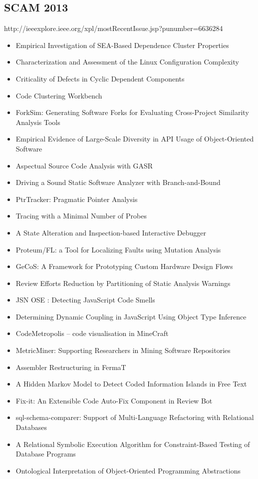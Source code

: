 \subsection{SCAM 2013}

http://ieeexplore.ieee.org/xpl/mostRecentIssue.jsp?punumber=6636284

{\small
\begin{itemize}[itemsep=-1ex]
  \item Empirical Investigation of SEA-Based Dependence Cluster Properties
  \item Characterization and Assessment of the Linux Configuration Complexity
  \item Criticality of Defects in Cyclic Dependent Components
  \item Code Clustering Workbench
  \item ForkSim: Generating Software Forks for Evaluating Cross-Project Similarity Analysis Tools
  \item Empirical Evidence of Large-Scale Diversity in API Usage of Object-Oriented Software
  \item Aspectual Source Code Analysis with GASR
  \item Driving a Sound Static Software Analyzer with Branch-and-Bound
  \item PtrTracker: Pragmatic Pointer Analysis
  \item Tracing with a Minimal Number of Probes
  \item A State Alteration and Inspection-based Interactive Debugger
  \item Proteum/FL: a Tool for Localizing Faults using Mutation Analysis
  \item GeCoS: A Framework for Prototyping Custom Hardware Design Flows
  \item Review Efforts Reduction by Partitioning of Static Analysis Warnings
  \item JSN OSE : Detecting JavaScript Code Smells
  \item Determining Dynamic Coupling in JavaScript Using Object Type Inference
  \item CodeMetropolis – code visualisation in MineCraft
  \item MetricMiner: Supporting Researchers in Mining Software Repositories
  \item Assembler Restructuring in FermaT
  \item A Hidden Markov Model to Detect Coded Information Islands in Free Text
  \item Fix-it: An Extensible Code Auto-Fix Component in Review Bot
  \item sql-schema-comparer: Support of Multi-Language Refactoring with Relational Databases
  \item A Relational Symbolic Execution Algorithm for Constraint-Based Testing of Database Programs
  \item Ontological Interpretation of Object-Oriented Programming Abstractions
\end{itemize}
}

